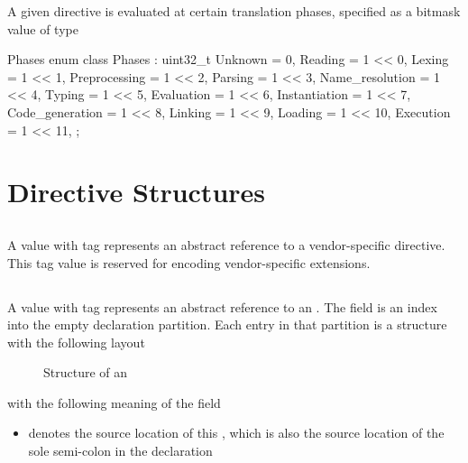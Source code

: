 A given directive is evaluated at certain translation phases, specified as a bitmask value of type
%
\begin{typedef}{Phases}{}
    enum class Phases : uint32_t {
        Unknown         = 0,
        Reading         = 1 << 0,
        Lexing          = 1 << 1,
        Preprocessing   = 1 << 2,
        Parsing         = 1 << 3,
        Name_resolution = 1 << 4,
        Typing          = 1 << 5,
        Evaluation      = 1 << 6,
        Instantiation   = 1 << 7,
        Code_generation = 1 << 8,
        Linking         = 1 << 9,
        Loading         = 1 << 10,
        Execution       = 1 << 11,
    };
\end{typedef}
%

\section{Directive Structures}
\label{sec:ifc-dir-structures}

\subsection{}
\label{sec:ifc:DirSort:VendorExtension}

A  value with tag  represents an abstract reference to a vendor-specific directive.
This tag value is reserved for encoding vendor-specific extensions.
  

\subsection{}
\label{sec:ifc:DirSort:Empty}

A  value with tag  represents an abstract reference to an .
The  field is an index into the empty declaration partition.
Each entry in that partition is a structure with the following layout
%
\begin{figure}[H]
    \centering
    \caption{Structure of an }
    \label{fig:ifc:DirSort:Empty}
\end{figure}
%
with the following meaning of the field
\begin{itemize}
    \item {} denotes the source location of this , which is also the source location of the sole semi-colon in the declaration
\end{itemize}

